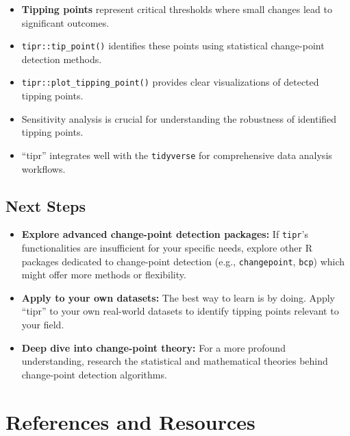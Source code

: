 \documentclass[
  10pt,
  letterpaper,
  DIV=11,
  numbers=noendperiod]{scrartcl}
\providecommand{\tightlist}{%
  \setlength{\itemsep}{0pt}\setlength{\parskip}{0pt}}
\begin{document}
\begin{itemize}
\tightlist
\item
  \textbf{Tipping points} represent critical thresholds where small
  changes lead to significant outcomes.
\item
  \texttt{tipr::tip\_point()} identifies these points using statistical
  change-point detection methods.
\item
  \texttt{tipr::plot\_tipping\_point()} provides clear visualizations of
  detected tipping points.
\item
  Sensitivity analysis is crucial for understanding the robustness of
  identified tipping points.
\item
  ``tipr'' integrates well with the \texttt{tidyverse} for comprehensive
  data analysis workflows.
\end{itemize}

\subsection{Next Steps}\label{next-steps}

\begin{itemize}
\tightlist
\item
  \textbf{Explore advanced change-point detection packages:} If
  \texttt{tipr}'s functionalities are insufficient for your specific
  needs, explore other R packages dedicated to change-point detection
  (e.g., \texttt{changepoint}, \texttt{bcp}) which might offer more
  methods or flexibility.
\item
  \textbf{Apply to your own datasets:} The best way to learn is by
  doing. Apply ``tipr'' to your own real-world datasets to identify
  tipping points relevant to your field.
\item
  \textbf{Deep dive into change-point theory:} For a more profound
  understanding, research the statistical and mathematical theories
  behind change-point detection algorithms.
\end{itemize}

\section{References and Resources}\label{references-and-resources}
\end{document}
